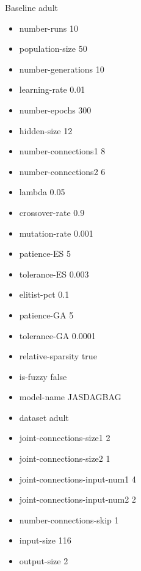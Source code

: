 Baseline
adult
\begin{itemize}
\item number-runs 10
\item population-size 50
\item number-generations 10
\item learning-rate 0.01
\item number-epochs 300
\item hidden-size 12
\item number-connections1 8
\item number-connections2 6
\item lambda 0.05
\item crossover-rate 0.9
\item mutation-rate 0.001
\item patience-ES 5
\item tolerance-ES 0.003
\item elitist-pct 0.1
\item patience-GA 5
\item tolerance-GA 0.0001
\item relative-sparsity true
\item is-fuzzy false
\item model-name JASDAGBAG
\item dataset adult
\item joint-connections-size1 2
\item joint-connections-size2 1
\item joint-connections-input-num1 4
\item joint-connections-input-num2 2
\item number-connections-skip 1
\item input-size 116
\item output-size 2
\end{itemize}

